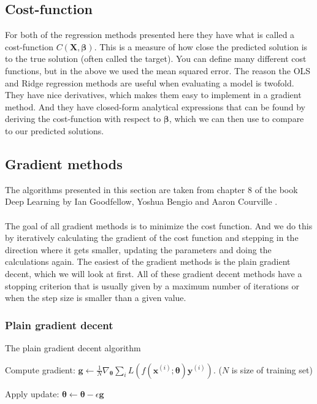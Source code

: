 \subsection{Cost-function}
{
    For both of the regression methods presented here they have what is called
    a cost-function $C(\boldsymbol{X}, \boldsymbol{\beta})$. This is a measure
    of how close the predicted solution is to the true solution (often called
    the target). You can define many different cost functions, but in the above
    we used the mean squared error. The reason the OLS and Ridge regression
    methods are useful when evaluating a model is twofold. They have nice
    derivatives, which makes them easy to implement in a gradient method. And
    they have closed-form analytical expressions that can be found by deriving
    the cost-function with respect to $\boldsymbol{\beta}$, which we can then
    use to compare to our predicted solutions.
}

\subsection{Gradient methods}
The algorithms presented in this section are taken from chapter 8 of the book
Deep Learning by Ian Goodfellow, Yoshua Bengio and Aaron Courville
\cite{Goodfellow}.
\\~\\
The goal of all gradient methods is to minimize the cost function. And we do
this by iteratively calculating the gradient of the cost function and stepping
in the direction where it gets smaller, updating the parameters and doing the
calculations again. The easiest of the gradient methods is the plain gradient
decent, which we will look at first. All of these gradient decent methods have
a stopping criterion that is usually given by a maximum number of iterations or
when the step size is smaller than a given value.

\subsubsection{Plain gradient decent}
\begin{algorithm}
\caption{The plain gradient decent algorithm}\label{algo:plain_gd}
\begin{algorithmic}
    
        
        Compute gradient: $\boldsymbol{g}\gets \frac{1}{N}\nabla_{\boldsymbol\theta}
        \sum_{i}L(f(\boldsymbol{x}^{(i)};\boldsymbol{\theta})\boldsymbol{y}^{(i)})$.
        ($N$ is size of training set)

        Apply update: $\boldsymbol\theta \gets \boldsymbol\theta
        -\epsilon\boldsymbol{g}$
    \EndWhile
\end{algorithmic}
\end{algorithm}

